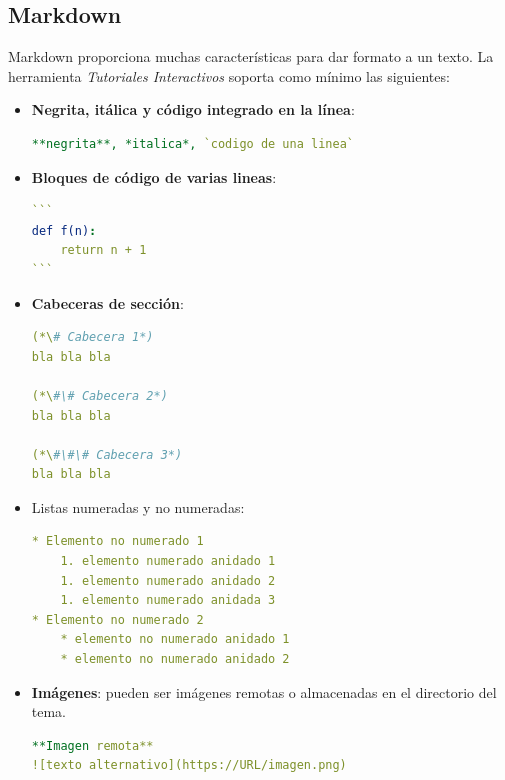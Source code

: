 \documentclass[]{article}
\newcommand{\toolname}{\emph{Tutoriales Interactivos}}
\begin{document}
\subsection{Markdown}
Markdown proporciona muchas características para dar formato a un texto. La herramienta \toolname{} soporta como mínimo las siguientes:
\begin{itemize}
	\item \textbf{Negrita, itálica y código integrado en la línea}:
\begin{lstlisting}[language=yaml,numbers=none]
**negrita**, *italica*, `codigo de una linea`
\end{lstlisting}	
	\item \textbf{Bloques de código de varias lineas}:
\begin{lstlisting}[language=yaml,numbers=none]
```
def f(n):
    return n + 1
```
\end{lstlisting}
	\item \textbf{Cabeceras de sección}:
\begin{lstlisting}[language=yaml,numbers=none]
(*\# Cabecera 1*)
bla bla bla

(*\#\# Cabecera 2*)
bla bla bla

(*\#\#\# Cabecera 3*)
bla bla bla

\end{lstlisting}
	\item Listas numeradas y no numeradas:
\begin{lstlisting}[language=yaml,numbers=none]
* Elemento no numerado 1
    1. elemento numerado anidado 1
    1. elemento numerado anidado 2
    1. elemento numerado anidada 3
* Elemento no numerado 2
    * elemento no numerado anidado 1
    * elemento no numerado anidado 2 
\end{lstlisting}	
	\item \textbf{Imágenes}: pueden ser imágenes remotas o almacenadas en el directorio del tema.
\begin{lstlisting}[language=yaml,numbers=none]
**Imagen remota**
![texto alternativo](https://URL/imagen.png)


\end{lstlisting}
\end{itemize}
\end{document}
